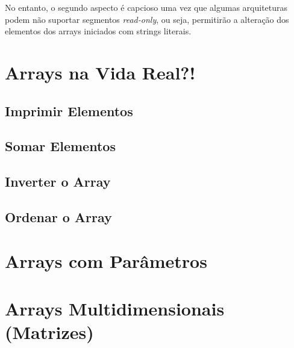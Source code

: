 No entanto, o segundo aspecto é capcioso uma vez que algumas arquiteturas podem
não suportar segmentos \textit{read-only}, ou seja, permitirão a alteração dos
elementos dos arrays iniciados com strings literais.

\section{Arrays na Vida Real?!}
\subsection{Imprimir Elementos}
\subsection{Somar Elementos}
\subsection{Inverter o Array}
\subsection{Ordenar o Array}

\section{Arrays com Parâmetros}

\section{Arrays Multidimensionais (Matrizes)}


